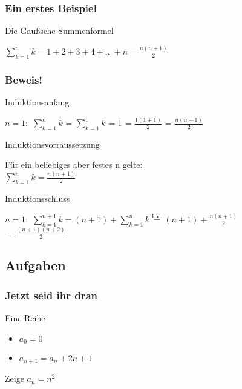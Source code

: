 \documentclass{beamer}
\begin{document}
\begin{frame}
	\frametitle{Ein erstes Beispiel}
	\begin{block}{Die Gaußsche Summenformel}
		\begin{center}
			$\sum\limits_{k=1}^{n}k  =  1 + 2 + 3 + 4 + \ldots + n =
			\frac{n(n+1)}{2}$
		\end{center}
	\end{block}
\end{frame}

\begin{frame}
	\frametitle{Beweis!}
	\begin{block}{Induktionsanfang}
		\begin{center}
			$n = 1:$ \hspace{10mm}  $\sum\limits_{k=1}^{n}k$ = $\sum\limits_{k=1}^{1}k$ =  1
			= $\frac{1(1+1)}{2}$ = $\frac{n(n+1)}{2}$ \hspace{15mm} \uncover<2->{$\Box$}
		\end{center}
	\end{block}

	 {
	\begin{block}{Induktionsvorraussetzung}
		\begin{center}
			 F\"ur ein beliebiges aber festes n gelte: \\
			$\sum\limits_{k=1}^{n}k = \frac{n(n+1)}{2}$
		\end{center}
	\end{block} }

	 {
	\begin{block}{Induktionsschluss}
		\begin{center}	
		$n = 1:$ \hspace{10mm} 
		$\sum\limits_{k=1}^{n+1}k = (n+1)+ \sum\limits_{k=1}^{n}k \stackrel{\mathrm{I.V.}}= 
		(n+1)+\frac{n(n+1)}{2} $ \\
		$= \frac{(n+1)(n+2)}{2}  $ \uncover<5->{$\Box$}
		
		\end{center}
	\end{block} }
\end{frame}

\subsection[Aufgaben]{Aufgaben}
\begin{frame}
	\frametitle{Jetzt seid ihr dran}
	\begin{block}{Eine Reihe}
		\begin{itemize}
  			\item $a_{0} = 0$
  			\item $a_{n+1} = a_{n} + 2n + 1$
		\end{itemize}
	\end{block}
	
	\vspace{5mm}

	{
 	\begin{block}{Zeige}
	$a_n = n^2$
	\end{block} 
	}
\end{frame}
\end{document}
